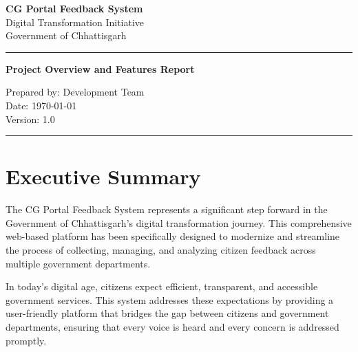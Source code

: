 \documentclass[12pt,a4paper]{article}
\begin{document}
\begin{titlepage}
    \centering
    \vspace*{2cm}
    
    {\Huge\bfseries\color{cgblue} CG Portal Feedback System}\\[0.5cm]
    {\Large\color{cgorange} Digital Transformation Initiative}\\[1cm]
    {\large Government of Chhattisgarh}\\[2cm]
    
    \begin{center}
        \textcolor{cggreen}{\rule{8cm}{0.4pt}}
    \end{center}
    
    \vspace{2cm}
    
    {\Large\bfseries Project Overview and Features Report}\\[1cm]
    
    \vfill
    
    {\large Prepared by: Development Team}\\
    {\large Date: \today}\\
    {\large Version: 1.0}
    
    \vspace{1cm}
    
    \begin{center}
        \textcolor{cggreen}{\rule{8cm}{0.4pt}}
    \end{center}
    
\end{titlepage}

\tableofcontents
\newpage

\section{Executive Summary}

The CG Portal Feedback System represents a significant step forward in the Government of Chhattisgarh's digital transformation journey. This comprehensive web-based platform has been specifically designed to modernize and streamline the process of collecting, managing, and analyzing citizen feedback across multiple government departments.

In today's digital age, citizens expect efficient, transparent, and accessible government services. This system addresses these expectations by providing a user-friendly platform that bridges the gap between citizens and government departments, ensuring that every voice is heard and every concern is addressed promptly.
\end{document}
